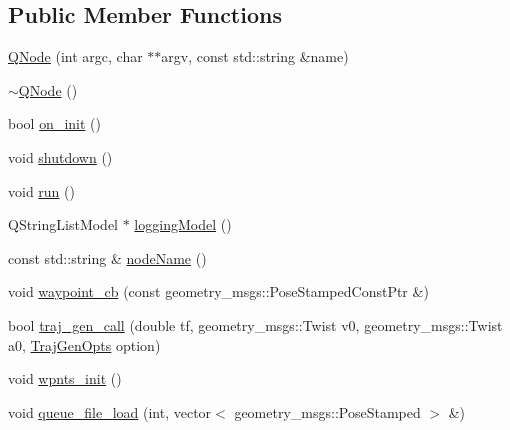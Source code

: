 \subsection*{Public Member Functions}
\begin{DoxyCompactItemize}
\item 
\hyperlink{class_q_node_af26ee8c152283b4a1999dc5d4bd67908}{Q\+Node} (int argc, char $\ast$$\ast$argv, const std\+::string \&name)
\item 
\hyperlink{class_q_node_afed12669e9aed3e70721f507804778ca}{$\sim$\+Q\+Node} ()
\item 
bool \hyperlink{class_q_node_a32d00dbcf15c277e08caabf95af04f6e}{on\+\_\+init} ()
\item 
void \hyperlink{class_q_node_a770568addece696138f515d38408ff5c}{shutdown} ()
\item 
void \hyperlink{class_q_node_ae585b201389c51a177fa5e2fde252c84}{run} ()
\item 
Q\+String\+List\+Model $\ast$ \hyperlink{class_q_node_a0a6dae02f9e317488095367203fa8a58}{logging\+Model} ()
\item 
const std\+::string \& \hyperlink{class_q_node_ac21ae24311df97ac0e15c97179763b0e}{node\+Name} ()
\item 
void \hyperlink{class_q_node_a7d0604b662cbda7b970efaa08e5b855c}{waypoint\+\_\+cb} (const geometry\+\_\+msgs\+::\+Pose\+Stamped\+Const\+Ptr \&)
\item 
bool \hyperlink{class_q_node_af5092d0c618f01146c415c77bd025a35}{traj\+\_\+gen\+\_\+call} (double tf, geometry\+\_\+msgs\+::\+Twist v0, geometry\+\_\+msgs\+::\+Twist a0, \hyperlink{struct_traj_gen_opts}{Traj\+Gen\+Opts} option)
\item 
void \hyperlink{class_q_node_a2b1b82bfd6e5e6187fe8216ba840bb09}{wpnts\+\_\+init} ()
\item 
void \hyperlink{class_q_node_a2b816456344fcf2d809fe6ff5526b6e9}{queue\+\_\+file\+\_\+load} (int, vector$<$ geometry\+\_\+msgs\+::\+Pose\+Stamped $>$ \&)
\end{DoxyCompactItemize}
